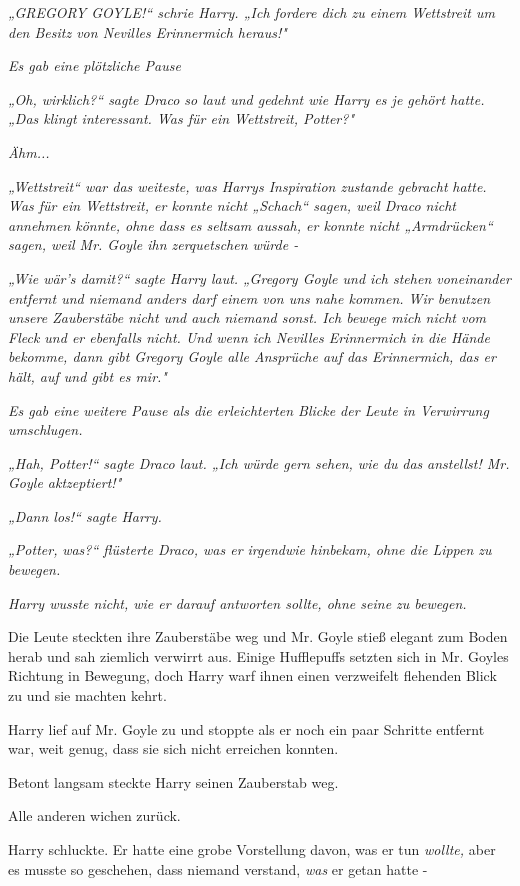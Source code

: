 {\emph{„\emph{GREGORY GOYLE!}“ schrie Harry. „\emph{Ich fordere dich zu einem Wettstreit um den Besitz von Nevilles Erinnermich heraus!}"}

\emph{Es gab eine plötzliche Pause}

\emph{„Oh, wirklich?“ sagte Draco so laut und gedehnt wie Harry es je gehört hatte. „Das klingt interessant. Was für ein Wettstreit, Potter?"}

\emph{Ähm...}

\emph{„Wettstreit“ war das weiteste, was Harrys Inspiration zustande gebracht} \emph{hatte. Was für ein Wettstreit, er konnte nicht „Schach“ sagen, weil Draco nicht annehmen könnte, ohne dass es seltsam aussah, er konnte nicht „Armdrücken“ sagen, weil Mr. Goyle ihn zerquetschen würde -}

\emph{„Wie wär's damit?“ sagte Harry laut. „Gregory Goyle und ich stehen voneinander entfernt und niemand anders darf einem von uns nahe kommen. Wir benutzen unsere Zauberstäbe nicht und auch niemand sonst. Ich bewege mich nicht vom Fleck und er ebenfalls nicht. Und wenn ich Nevilles Erinnermich in die Hände bekomme, dann gibt Gregory Goyle alle Ansprüche auf das Erinnermich, das er hält, auf und gibt es mir."}

\emph{Es gab eine weitere Pause als die erleichterten Blicke der Leute in Verwirrung umschlugen.}

\emph{„Hah, Potter!“ sagte Draco laut. „Ich würde gern sehen, wie du} \emph{\emph{das}} \emph{anstellst! Mr. Goyle aktzeptiert!"}

\emph{„Dann los!“ sagte Harry.}

\emph{„Potter,} \emph{\emph{was?}“ flüsterte Draco, was er irgendwie hinbekam, ohne die Lippen zu bewegen.}

\emph{Harry wusste nicht, wie er darauf antworten sollte, ohne seine zu bewegen.}

Die Leute steckten ihre Zauberstäbe weg und Mr. Goyle stieß elegant zum Boden herab und sah ziemlich verwirrt aus. Einige Hufflepuffs setzten sich in Mr. Goyles Richtung in Bewegung, doch Harry warf ihnen einen verzweifelt flehenden Blick zu und sie machten kehrt.

Harry lief auf Mr. Goyle zu und stoppte als er noch ein paar Schritte entfernt war, weit genug, dass sie sich nicht erreichen konnten.

Betont langsam steckte Harry seinen Zauberstab weg.

Alle anderen wichen zurück.

Harry schluckte. Er hatte eine grobe Vorstellung davon, was er tun \emph{wollte,} aber es musste so geschehen, dass niemand verstand, \emph{was} er getan hatte -

}
